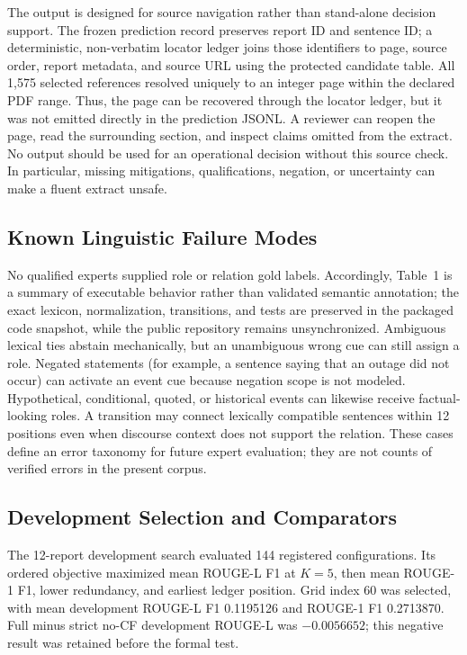 \documentclass[applsci,article,submit,moreauthors]{Definitions/mdpi}
\begin{document}
The output is designed for source navigation rather than stand-alone decision support. The frozen prediction record preserves report ID and sentence ID; a deterministic, non-verbatim locator ledger joins those identifiers to page, source order, report metadata, and source URL using the protected candidate table. All 1,575 selected references resolved uniquely to an integer page within the declared PDF range. Thus, the page can be recovered through the locator ledger, but it was not emitted directly in the prediction JSONL. A reviewer can reopen the page, read the surrounding section, and inspect claims omitted from the extract. No output should be used for an operational decision without this source check. In particular, missing mitigations, qualifications, negation, or uncertainty can make a fluent extract unsafe.

\subsection{Known Linguistic Failure Modes}

No qualified experts supplied role or relation gold labels. Accordingly, Table~1 is a summary of executable behavior rather than validated semantic annotation; the exact lexicon, normalization, transitions, and tests are preserved in the packaged code snapshot, while the public repository remains unsynchronized. Ambiguous lexical ties abstain mechanically, but an unambiguous wrong cue can still assign a role. Negated statements (for example, a sentence saying that an outage did not occur) can activate an event cue because negation scope is not modeled. Hypothetical, conditional, quoted, or historical events can likewise receive factual-looking roles. A transition may connect lexically compatible sentences within 12 positions even when discourse context does not support the relation. These cases define an error taxonomy for future expert evaluation; they are not counts of verified errors in the present corpus.

\subsection{Development Selection and Comparators}

The 12-report development search evaluated 144 registered configurations. Its ordered objective maximized mean ROUGE-L F1 at $K=5$, then mean ROUGE-1 F1, lower redundancy, and earliest ledger position. Grid index 60 was selected, with mean development ROUGE-L F1 0.1195126 and ROUGE-1 F1 0.2713870. Full minus strict no-CF development ROUGE-L was $-0.0056652$; this negative result was retained before the formal test.
\end{document}
